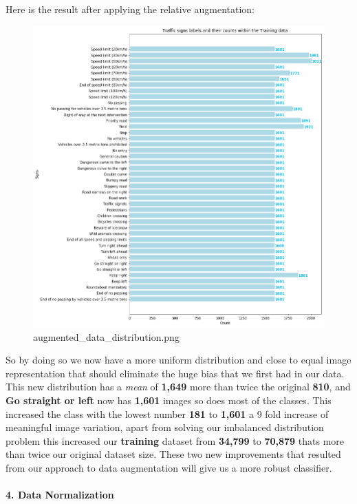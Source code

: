\documentclass[11pt]{article}
\makeatletter
\def\maxwidth{\ifdim\Gin@nat@width>\linewidth\linewidth
    \else\Gin@nat@width\fi}
\let\Oldincludegraphics\includegraphics
\renewcommand{\includegraphics}[1]{\Oldincludegraphics[width=.8\maxwidth]{#1}}
\makeatother
\begin{document}
Here is the result after applying the relative augmentation:

\begin{figure}
\centering
\includegraphics{./assets/augmented_data_distribution.png}
\caption{augmented\_data\_distribution.png}
\end{figure}

So by doing so we now have a more uniform distribution and close to
equal image representation that should eliminate the huge bias that we
first had in our data. This new distribution has a \emph{mean} of
\textbf{1,649} more than twice the original \textbf{810}, and \textbf{Go
straight or left} now has \textbf{1,601} images so does most of the
classes. This increased the class with the lowest number \textbf{181} to
\textbf{1,601} a 9 fold increase of meaningful image variation, apart
from solving our imbalanced distribution problem this increased our
\textbf{training} dataset from \textbf{34,799} to \textbf{70,879} thats
more than twice our original dataset size. These two new improvements
that resulted from our approach to data augmentation will give us a more
robust classifier.

\hypertarget{data-normalization}{%
\paragraph{4. Data Normalization}\label{data-normalization}}
\end{document}
